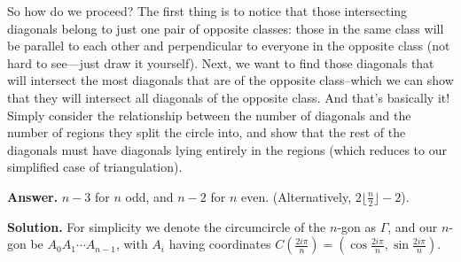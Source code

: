 \documentclass[11pt,a4paper]{article}
\begin{document}
\begin{itemize}
So how do we proceed? The first thing is to notice that those intersecting diagonals belong to just one pair of opposite classes: those in the same class will be parallel to each other and perpendicular to everyone in the opposite class (not hard to see---just draw it yourself). Next, we want to find those diagonals that will intersect the most diagonals that are of the opposite class--which we can show that they will intersect all diagonals of the opposite class. And that's basically it! Simply consider the relationship between the number of diagonals and the number of regions they split the circle into, and show that the rest of the diagonals must have diagonals lying entirely in the regions (which reduces to our simplified case of triangulation). 

\textbf {Answer. }$n-3$ for $n$ odd, and $n-2$ for $n$ even. (Alternatively, $2\lfloor \frac n2\rfloor-2$). 

\textbf{Solution.}
For simplicity we denote the circumcircle of the $n$-gon as $\Gamma$, and our $n$-gon be $A_0A_1\cdots A_{n-1}$, 
with $A_i$ having coordinates $C\left(\frac{2i\pi}{n}\right)=\left(\cos\frac{2i\pi}{n}, \sin\frac{2i\pi}{n}\right)$. 


\end{itemize}
\end{document}
